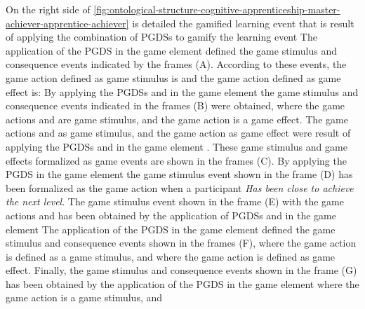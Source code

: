 On the right side of \autoref{fig:ontological-structure-cognitive-apprenticeship-master-achiever-apprentice-achiever} is detailed the gamified learning event  that is result of applying the combination of PGDSs  to gamify the learning event  The application of the PGDS  in the game element  defined the game stimulus and consequence events indicated by the frames (A). According to these events, the game action defined as game stimulus is  and the game action defined as game effect is:  By applying the PGDSs  and  in the game element  the game stimulus and consequence events indicated in the frames (B) were obtained, where the game actions  and  are game stimulus, and the game action  is a game effect. The game actions  and  as game stimulus, and the game action  as game effect were result of applying the PGDSs  and  in the game element . These game stimulus and game effects formalized as game events are shown in the frames (C). By applying the PGDS  in the game element  the game stimulus event shown in the frame (D) has been formalized as the game action  when a participant \emph{Has been close to achieve the next level}. The game stimulus event shown in the frame (E) with the game actions   and  has been obtained by the application of PGDSs  and  in the game element  The application of the PGDS  in the game element  defined the game stimulus and consequence events shown in the frames (F), where the game action  is defined as a game stimulus, and where the game action  is defined as game effect. Finally, the game stimulus and consequence events shown in the frame (G) has been obtained by the application of the PGDS  in the game element  where the game action  is a game stimulus, and 